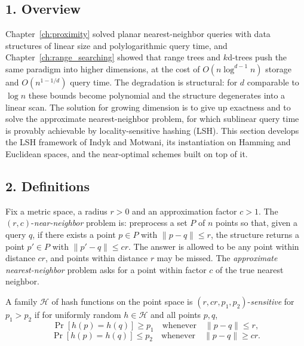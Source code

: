 \subsection{1. Overview}

Chapter~\ref{ch:proximity} solved planar nearest-neighbor queries with data
structures of linear size and polylogarithmic query time, and
Chapter~\ref{ch:range_searching} showed that range trees and $k$d-trees push
the same paradigm into higher dimensions, at the cost of
$O(n \log^{d-1} n)$ storage and $O(n^{1-1/d})$ query time. The degradation is
structural: for $d$ comparable to $\log n$ these bounds become polynomial and
the structure degenerates into a linear scan. The solution for growing
dimension is to give up exactness and to solve the
approximate nearest-neighbor problem, for
which sublinear query time is provably achievable by
locality-sensitive hashing (LSH). This
section develops the LSH framework of Indyk and Motwani, its instantiation on
Hamming and Euclidean spaces, and the near-optimal schemes built on top of it.

\subsection{2. Definitions}

\begin{definition}
\label{def:highdim_ann}
Fix a metric space, a radius $r > 0$ and an approximation factor $c > 1$. The
$(r,c)$-\emph{near-neighbor} problem is: preprocess a set $P$ of $n$ points so
that, given a query $q$, if there exists a point $p \in P$ with
$\|p - q\| \le r$, the structure returns a point $p' \in P$ with
$\|p' - q\| \le c r$. The answer is allowed to be any point within distance
$c r$, and points within distance $r$ may be missed. The
\emph{approximate nearest-neighbor} problem asks for a point within factor
$c$ of the true nearest neighbor.
\end{definition}

\begin{definition}
\label{def:highdim_lsh}
A family $\mathcal{H}$ of hash functions on the point space is
$(r, c r, p_1, p_2)$-\emph{sensitive} for $p_1 > p_2$ if for uniformly random
$h \in \mathcal{H}$ and all points $p, q$,
\[
\Pr[h(p) = h(q)] \ge p_1 \quad\text{whenever}\quad \|p - q\| \le r,
\]
\[
\Pr[h(p) = h(q)] \le p_2 \quad\text{whenever}\quad \|p - q\| \ge c r.
\]
\end{definition}

